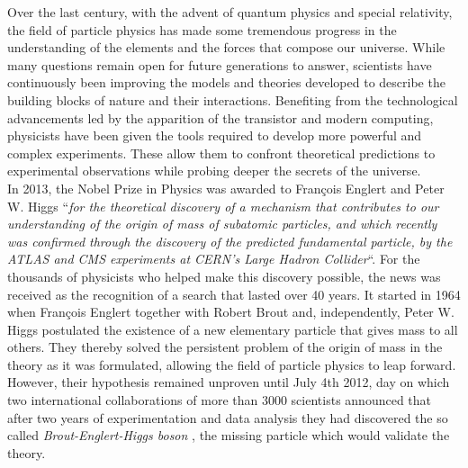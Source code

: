 Over the last century, with the advent of quantum physics and special relativity, the field of particle physics has made some tremendous progress in the understanding of the elements and the forces that compose our universe. While many questions remain open for future generations to answer, scientists have continuously been improving the models and theories developed to describe the building blocks of nature and their interactions. Benefiting from the technological advancements led by the apparition of the transistor and modern computing, physicists have been given the tools required to develop more powerful and complex experiments. These allow them to confront theoretical predictions to experimental observations while probing deeper the secrets of the universe. \\

In 2013, the Nobel Prize in Physics was awarded to Fran\c{c}ois Englert and Peter W. Higgs ``\textit{for the theoretical discovery of a mechanism that contributes to our understanding of the origin of mass of subatomic particles, and which recently was confirmed through the discovery of the predicted fundamental particle, by the ATLAS and CMS experiments at CERN's Large Hadron Collider}``. For the thousands of physicists who helped make this discovery possible, the news was received as the recognition of a search that lasted over 40 years. It started in 1964 when Fran\c{c}ois Englert together with Robert Brout \cite{PhysRevLett.13.321} and, independently, Peter W. Higgs \cite{PhysRevLett.13.508} postulated the existence of a new elementary particle that gives mass to all others. They thereby solved the persistent problem of the origin of mass in the theory as it was formulated, allowing the field of particle physics to leap forward. However, their hypothesis remained unproven until July 4th 2012, day on which two international collaborations of more than 3000 scientists announced that after two years of experimentation and data analysis they had discovered the so called \textit{Brout-Englert-Higgs boson} \cite{PhysRevLett.114.191803}, the missing particle which would validate the theory. \\

